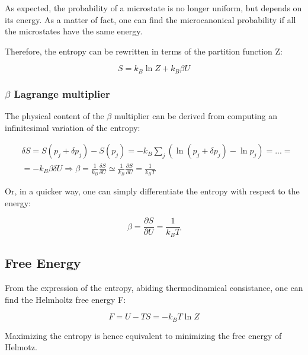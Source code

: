 \documentclass{article}
\begin{document}
As expected, the probability of a microstate is no longer uniform, but depends on its energy.
As a matter of fact, one can find the microcanonical probability if all the microstates have the same energy.

Therefore, the entropy can be rewritten in terms of the partition function Z:

\begin{equation}
    S=k_B\ln{Z}+k_B\beta U
\end{equation}

\subsubsection{$\beta$ Lagrange multiplier}

The physical content of the $\beta$ multiplier can be derived from computing
an infinitesimal variation of the entropy:

\begin{align*}
     & \delta S= S(p_j+\delta p_j)-S(p_j) = -k_B\sum_{j}(\ln{(p_j+\delta p_j)}-\ln{p_j})=...=                                                            \\
     & = -k_B\beta\delta U \Longrightarrow \beta=\frac{1}{k_B}\frac{\delta S}{\delta U}\simeq \frac{1}{k_B}\frac{\partial S}{\partial U}= \frac{1}{k_BT}
\end{align*}

Or, in a quicker way, one can simply differentiate the entropy with respect to the energy:

\begin{equation}
    \beta=\frac{\partial S}{\partial U}= \frac{1}{k_BT}
\end{equation}

\subsection{Free Energy}
From the expression of the entropy, abiding thermodinamical consistance, one can find the Helmholtz free energy F:

\begin{tcolorbox}[colframe=gray!50, colback=gray!10, coltitle=black, title=Helmholtz Free Energy]
    \begin{equation}
        F = U - TS = -k_BT \ln{Z}
    \end{equation}
\end{tcolorbox}

Maximizing the entropy is hence equivalent to minimizing the free energy of Helmotz.
\end{document}
